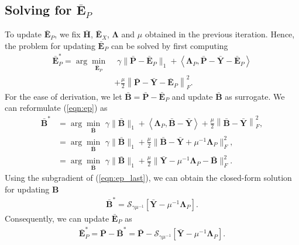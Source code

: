 \documentclass[10pt,journal,compsoc]{IEEEtran}
\begin{document}
\subsection{Solving for $\bar{\mathbf{E}}_P$}
To update $\bar{\mathbf{E}}_P$, we fix $\bar{\mathbf{H}}$, $\bar{\mathbf{E}}_X$, $\mathbf{\Lambda}$ and $\mu$ obtained in the previous iteration.
Hence, the problem for updating $\bar{\mathbf{E}}_P$ can be solved by first computing
{
\begin{equation}
\begin{aligned}
\bar{\mathbf{E}}_P^* = \arg\!\min_{\bar{\mathbf{E}}_P} & \,\,  \gamma  \|\bar{\mathbf{P}} - \bar{\mathbf{E}}_P\|_1
 + \left \langle  \mathbf{\Lambda}_P , \bar{\mathbf{P}} - \bar{\mathbf{Y}} - \bar{\mathbf{E}}_P
 \right \rangle \\
&+ \frac{\mu}{2}  \left\|
\bar{\mathbf{P}} - \bar{\mathbf{Y}} - \bar{\mathbf{E}}_P
 \right\|_F^2.\label{eqn:ep}
\end{aligned}
\end{equation}}
For the ease of derivation, we let $\bar{\mathbf{B}} =  \bar{\mathbf{P}} - \bar{\mathbf{E}}_P$ and update $\bar{\mathbf{B}}$ as surrogate. We can reformulate (\ref{eqn:ep}) as
{
\begin{equation}
\begin{aligned}
\bar{\mathbf{B}}^* &= \arg\!\min_{\bar{\mathbf{B}}} \,\,  \gamma  \|\bar{\mathbf{B}}\|_1
 + \left \langle  \mathbf{\Lambda}_P , \bar{\mathbf{B}} - \bar{\mathbf{Y}}
 \right \rangle + \frac{\mu}{2}  \left\|
\bar{\mathbf{B}} - \bar{\mathbf{Y}}
 \right\|_F^2, \\
&= \arg\!\min_{\bar{\mathbf{B}}} \,\,  \gamma  \|\bar{\mathbf{B}}\|_1  + \frac{\mu}{2} \| \bar{\mathbf{B}} - \bar{\mathbf{Y}}   + \mu^{-1}\mathbf{\Lambda}_P  \|_F^2,\\
&= \arg\!\min_{\bar{\mathbf{B}}} \,\,  \gamma  \|\bar{\mathbf{B}}\|_1  + \frac{\mu}{2} \|   \bar{\mathbf{Y}}  - \mu^{-1}\mathbf{\Lambda}_P - \bar{\mathbf{B}} \|_F^2. \label{eqn:ep_last}
\end{aligned}
\end{equation}}
Using the subgradient of (\ref{eqn:ep_last}), we can obtain the closed-form solution for updating $\mathbf{B}$
\begin{align}
\bar{\mathbf{B}}^* = \mathcal{S}_{ \gamma  \mu^{-1}}[ \bar{\mathbf{Y}} - \mu^{-1} \mathbf{\Lambda}_P].
\end{align}
Consequently, we can update $\bar{\mathbf{E}}_P$ as
\begin{align}
\bar{\mathbf{E}}_P^* = \bar{\mathbf{P}} - \bar{\mathbf{B}}^* = \bar{\mathbf{P}} - \mathcal{S}_{ \gamma  \mu^{-1}}[ \bar{\mathbf{Y}} - \mu^{-1} \mathbf{\Lambda}_P].
\end{align}
\end{document}
